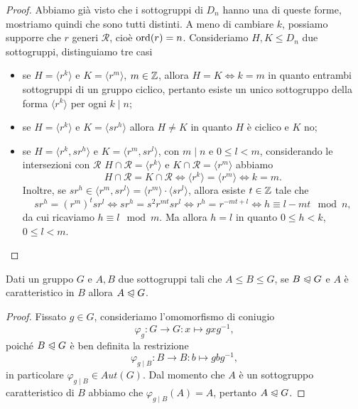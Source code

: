 \documentclass[11pt]{scrartcl}
\begin{document}
\begin{proof}
    Abbiamo già visto che i sottogruppi di $D_n$ hanno una di queste forme, 
    mostriamo quindi che sono tutti distinti. A meno di cambiare $k$, possiamo
    supporre che $r$ generi $\mathcal{R}$, cioè $\operatorname{ord}(r) = n$. 
    Consideriamo $H, K\leq D_n$ due sottogruppi, distinguiamo tre casi 
    \begin{itemize}
        \item se $H = \langle r^k\rangle$ e $K = \langle r^m\rangle$, $m \in \mathbb Z$,
        allora $H = K\iff k = m$ in quanto entrambi sottogruppi di un gruppo 
        ciclico, pertanto esiste un unico sottogruppo della forma $\langle r^k\rangle$
        per ogni $k \mid n$;
        \item se $H = \langle r^k\rangle$ e $K = \langle sr^h\rangle$ allora $H \neq K$
        in quanto $H$ è ciclico e $K$ no;
        \item se $H = \langle r^k, sr^h\rangle$ e $K = \langle r^m, sr^l\rangle$, 
        con $m \mid n$ e $0\leq l < m$, considerando le intersezioni con $\mathcal{R}$ 
        $H \cap \mathcal{R} = \langle r^k\rangle$ e $K \cap \mathcal{R} = \langle r^m\rangle$ 
        abbiamo \[
        H \cap \mathcal{R} = K\cap\mathcal{R} \iff \langle r^k\rangle = \langle r^m\rangle
        \iff k = m.
        \] Inoltre, se $sr^h \in \langle r^m, sr^l\rangle = \langle r^m\rangle
        \cdot \langle sr^l\rangle$, allora esiste $t \in \mathbb Z$ tale che \[
        sr^h = (r^m)^t sr^l \iff sr^h = s^2r^{mt}sr^l \iff r^h = r^{-mt + l}
        \iff h \equiv l - mt \mod n,
        \]da cui ricaviamo $h \equiv l \mod m$. Ma allora $h =l$ in quanto 
        $0 \leq h < k$, $0\leq l < m$.
    \end{itemize}
\end{proof}

\begin{lemma}
    \label{lemma1}
    Dati un gruppo $G$ e $A, B$ due sottogruppi tali che $A \leq B \leq G$,
    se $B\trianglelefteqslant G$ e $A$ è caratteristico in $B$ allora 
    $A \trianglelefteqslant G$.
\end{lemma}

\begin{proof}
    Fissato $g \in G$, consideriamo l'omomorfismo di coniugio 
    \[
        \varphi_g : G\longrightarrow G : x\longmapsto gxg^{-1},
    \] poiché 
    $B\trianglelefteqslant G$ è ben definita la restrizione \[
        \varphi_{g\mid B} : B\longrightarrow B :  b \longmapsto gbg^{-1},
    \]in particolare $\varphi_{g\mid B} \in Aut(G)$. Dal momento che $A$ è
    un sottogruppo caratteristico di $B$ abbiamo che $\varphi_{g\mid B}(A) = A$,
    pertanto $A \trianglelefteqslant G$.
\end{proof}
\end{document}
